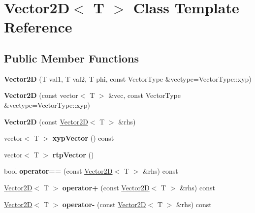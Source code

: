 \hypertarget{class_vector2_d}{}\section{Vector2D$<$ T $>$ Class Template Reference}
\label{class_vector2_d}
\subsection*{Public Member Functions}
\begin{DoxyCompactItemize}
\item 
\mbox{\label{class_vector2_d_a3fe91726229151ed3eff9aeecbb4c353}} 
{\bfseries Vector2D} (T val1, T val2, T phi, const Vector\+Type \&vectype=Vector\+Type\+::xyp)
\item 
\mbox{\label{class_vector2_d_aad4e97ea1e0ef66c31a002209c51256b}} 
{\bfseries Vector2D} (const vector$<$ T $>$ \&vec, const Vector\+Type \&vectype=Vector\+Type\+::xyp)
\item 
\mbox{\label{class_vector2_d_acd8431330929b93d97d4549848aa229c}} 
{\bfseries Vector2D} (const \hyperlink{class_vector2_d}{Vector2D}$<$ T $>$ \&rhs)
\item 
\mbox{\label{class_vector2_d_a2f3fe0560fcbf8a673c1385ce7455ffc}} 
vector$<$ T $>$ {\bfseries xyp\+Vector} () const
\item 
\mbox{\label{class_vector2_d_aac220a4be6fe3a90cdb39ae6bbc7c530}} 
vector$<$ T $>$ {\bfseries rtp\+Vector} ()
\item 
\mbox{\label{class_vector2_d_a48012be2debc9e98895466e182dd2809}} 
bool {\bfseries operator==} (const \hyperlink{class_vector2_d}{Vector2D}$<$ T $>$ \&rhs) const
\item 
\mbox{\label{class_vector2_d_a57c89e2117c24b4ed6757ad9becbdd9c}} 
\hyperlink{class_vector2_d}{Vector2D}$<$ T $>$ {\bfseries operator+} (const \hyperlink{class_vector2_d}{Vector2D}$<$ T $>$ \&rhs) const
\item 
\mbox{\label{class_vector2_d_a322709c9ed0691606ba2545de90df155}} 
\hyperlink{class_vector2_d}{Vector2D}$<$ T $>$ {\bfseries operator-\/} (const \hyperlink{class_vector2_d}{Vector2D}$<$ T $>$ \&rhs) const

\end{DoxyCompactItemize}

